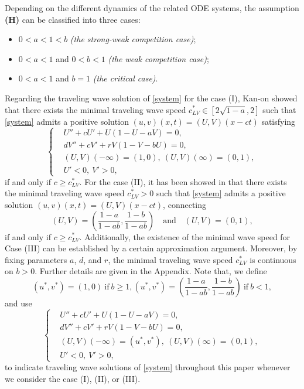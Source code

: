 \documentclass[11pt,a4paper]{article}
\numberwithin{equation}{section}
\numberwithin{figure}{section}
\begin{document}
Depending on the different dynamics of the related ODE systems, the assumption {\bf(H)} can be classified into three cases:
\begin{itemize}
\item[(I)] $0<a<1<b$ {\em{(the strong-weak competition case)}};
\item[(II)] $0<a<1$ and $0<b<1$ {\em{(the weak competition case)}};
\item[(III)] $0<a<1$ and $b=1$ {\em{(the critical case)}}.
\end{itemize}
Regarding the traveling wave solution of \eqref{system} for the case (I),
Kan-on  \cite{Kan-on1997} showed
that there exists
the minimal traveling wave speed $c_{LV}^{*}\in[2\sqrt{1-a},2]$
such that \eqref{system} admits a positive solution
$(u,v)(x,t)=(U,V)(x-ct)$
 satisfying
\begin{equation}\label{tw solution}
\left\{
\begin{aligned}
&U''+cU'+U(1-U-aV)=0,\\
&dV''+cV'+rV(1-V-bU)=0,\\
&(U,V)(-\infty)=(1,0),\ (U,V)(\infty)=(0,1),\\
&U'<0,\ V'>0,
\end{aligned}
\right.
\end{equation}
if and only if $c\ge c_{LV}^{*}$.
For the case (II),
it has been showed in \cite[Example 4.2]{Lewis Li Weinberger 2} that
there exists
the minimal traveling wave speed $c_{LV}^{*}>0$
such that \eqref{system} admits a positive solution
$(u,v)(x,t)=(U,V)(x-ct)$, connecting 
$$(U,V)=(\frac{1-a}{1-ab},\frac{1-b}{1-ab})\quad \text{and}\quad (U,V)=(0,1),$$
if and only if $c\ge c_{LV}^{*}$.
Additionally, the existence of the minimal wave speed for Case (III) can be established by a certain approximation argument.
Moreover, by fixing parameters $a$, $d$, and $r$, the minimal traveling wave speed $c_{LV}^{*}$ is continuous on $b>0$.
Further details
are given in the Appendix.
Note that,  we define
$$(u^*,v^*)=(1,0)\ \text{if}\ b\ge 1, (u^*,v^*)=(\frac{1-a}{1-ab},\frac{1-b}{1-ab})\ \text{if}\ b<1,$$
and use 
\begin{equation}\label{tw solution weak}
\left\{
\begin{aligned}
&U''+cU'+U(1-U-aV)=0,\\
&dV''+cV'+rV(1-V-bU)=0,\\
&(U,V)(-\infty)=(u^*,v^*),\ (U,V)(\infty)=(0,1),\\
&U'<0,\ V'>0,
\end{aligned}
\right.
\end{equation}
to indicate traveling wave solutions of \eqref{system} throughout this paper
whenever we consider the case (I), (II), or (III).
\end{document}

